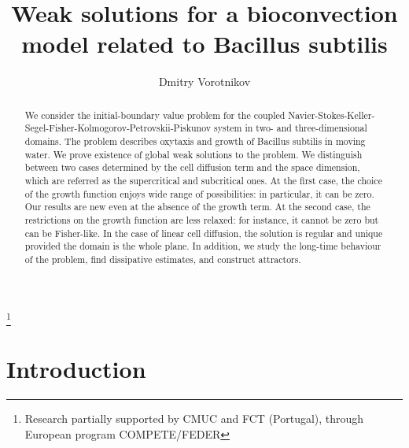 \documentclass[10pt]{amsart}
\begin{document}
\title[Weak solutions for a bioconvection model]{Weak solutions for a bioconvection model related to Bacillus subtilis}

\author[D.Vorotnikov]{Dmitry Vorotnikov}


\thanks{Research partially supported by CMUC and FCT (Portugal), through
European program COMPETE/FEDER}


\begin{abstract} We consider the initial-boundary value problem for the coupled
Navier-Stokes-Keller-Segel-Fisher-Kolmogorov-Petrovskii-Piskunov
system in two- and three-dimensional domains. The problem describes oxytaxis and growth of Bacillus
subtilis in moving water. We prove existence of global weak solutions to the problem. We distinguish between two cases determined by the cell diffusion term and the space dimension, which are referred as the supercritical and subcritical ones. At the first case, the choice of the growth function enjoys wide range of possibilities: in particular, it can be zero. Our results are new even at the absence of the growth term. At the second case, the restrictions on the growth function are less relaxed: for instance, it cannot be zero but can be Fisher-like. In the case of linear cell diffusion, the solution is regular and unique provided the domain is the whole plane. In addition, we study the long-time behaviour of the problem, find dissipative estimates, and construct attractors. 
\end{abstract}

\maketitle

\section {Introduction}
\end{document}
